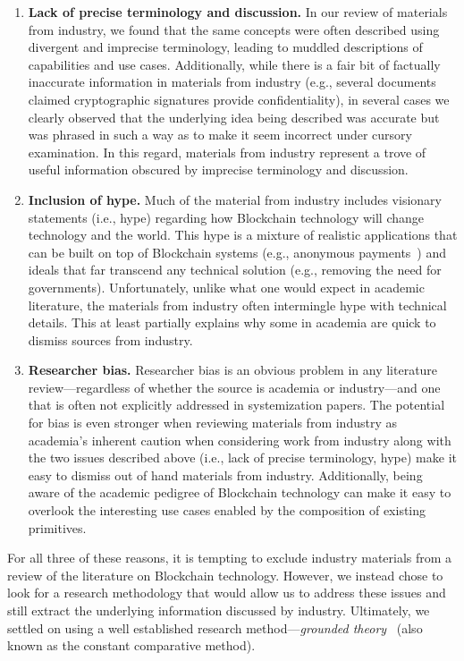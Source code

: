 \begin{enumerate}
	\item \textbf{Lack of precise terminology and discussion.}
	In our review of materials from industry, we found that the same concepts were often described using divergent and imprecise terminology, leading to muddled descriptions of capabilities and use cases.
	Additionally, while there is a fair bit of factually inaccurate information in materials from industry (e.g., several documents claimed cryptographic signatures provide confidentiality), in several cases we clearly observed that the underlying idea being described was accurate but was phrased in such a way as to make it seem incorrect under cursory examination.
	In this regard, materials from industry represent a trove of useful information obscured by imprecise terminology and discussion.
	
	\item \textbf{Inclusion of hype.}
	Much of the material from industry includes visionary statements (i.e., hype) regarding how Blockchain technology will change technology and the world.
	This hype is a mixture of realistic applications that can be built on top of Blockchain systems (e.g., anonymous payments~\cite{chaum1988untraceable}) and ideals that far transcend any technical solution (e.g., removing the need for governments).
	Unfortunately, unlike what one would expect in academic literature, the materials from industry often intermingle hype with technical details. This at least partially explains why some in academia are quick to dismiss sources from industry.
	
	\item \textbf{Researcher bias.}	
	Researcher bias is an obvious problem in any literature review---regardless of whether the source is academia or industry---and one that is often not explicitly addressed in systemization papers.
	The potential for bias is even stronger when reviewing materials from industry as academia's inherent caution when considering work from industry along with the two issues described above (i.e., lack of precise terminology, hype) make it easy to dismiss out of hand materials from industry.
	Additionally, being aware of the academic pedigree of Blockchain technology can make it easy to overlook the interesting use cases enabled by the composition of existing primitives.
	
\end{enumerate}

For all three of these reasons, it is tempting to exclude industry materials from a review of the literature on Blockchain technology.
However, we instead chose to look for a research methodology that would allow us to address these issues and still extract the underlying information discussed by industry.
Ultimately, we settled on using a well established research method---\emph{grounded theory}~\cite{glaser1965constant,strauss1990basics,corbin1990grounded} (also known as the constant comparative method).

